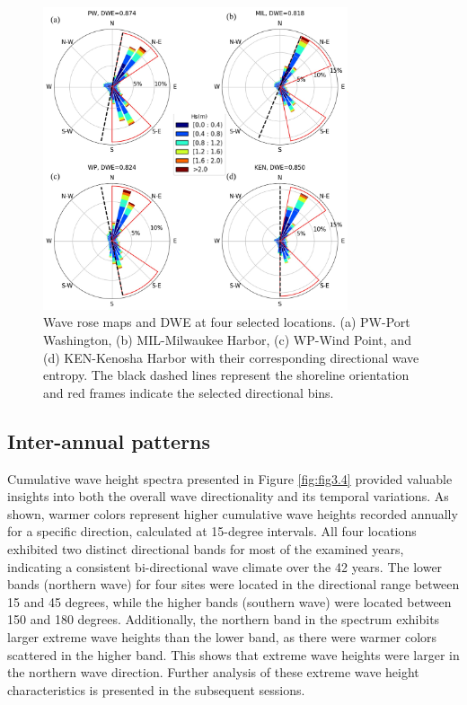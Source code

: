 \begin{figure}[htbp]
  \centering
  \includegraphics[width=0.8\textwidth]{chapter3/resources/figure3-3.jpg}
  \caption{Wave rose maps and DWE at four selected locations. (a) PW-Port Washington, (b) MIL-Milwaukee Harbor, (c) WP-Wind Point, and (d) KEN-Kenosha Harbor with their corresponding directional wave entropy. The black dashed lines represent the shoreline orientation and red frames indicate the selected directional bins.}
  \label{fig:fig3.3}
\end{figure}

\subsection{Inter-annual patterns}
\label{c3_Inter-annual patterns}

Cumulative wave height spectra presented in Figure \ref{fig:fig3.4} provided
valuable insights into both the overall wave directionality and its temporal
variations. As shown, warmer colors represent higher cumulative wave heights
recorded annually for a specific direction, calculated at 15-degree intervals.
All four locations exhibited two distinct directional bands for most of the
examined years, indicating a consistent bi-directional wave climate over the 42
years. The lower bands (northern wave) for four sites were located in the
directional range between 15 and 45 degrees, while the higher bands (southern
wave) were located between 150 and 180 degrees. Additionally, the northern band
in the spectrum exhibits larger extreme wave heights than the lower band, as
there were warmer colors scattered in the higher band. This shows that extreme
wave heights were larger in the northern wave direction. Further analysis of
these extreme wave height characteristics is presented in the subsequent
sessions.

